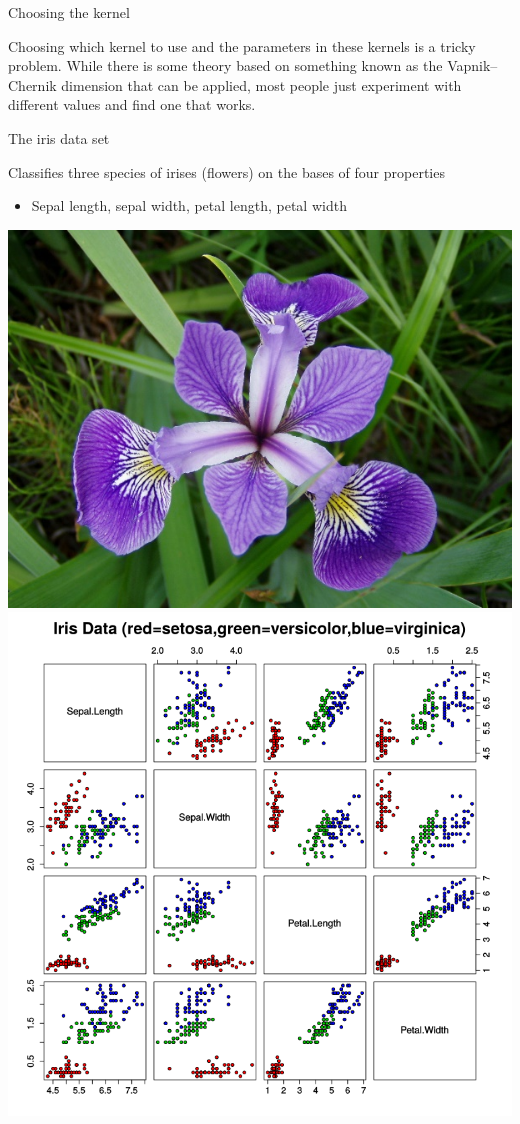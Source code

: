 \documentclass[compress]{beamer}
\begin{document}
\begin{frame}{Choosing the kernel}


Choosing which kernel to use and the parameters in these kernels is a
tricky problem. While there is some theory based on something known as
the Vapnik--Chernik dimension that can be applied, most people just
experiment with different values and find one that works.

\end{frame}



\begin{frame}{The iris data set}

Classifies three species of irises (flowers) on the bases of four
properties

\begin{itemize}

\item Sepal length, sepal width, petal length, petal width
\end{itemize}


    \begin{center}
        \includegraphics[width=0.35\linewidth]{iris}
        \includegraphics[width=0.5\linewidth]{iris-classification}
    \end{center}

\end{frame}
\end{document}
